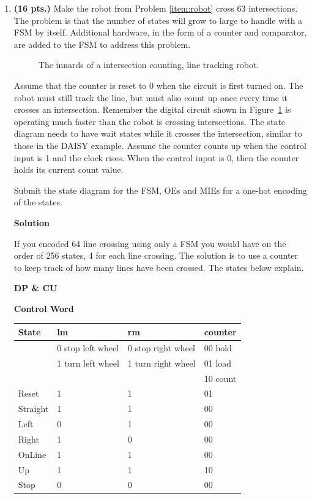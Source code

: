 \begin{enumerate}
\item \textbf{ (16 pts.)}
Make the robot from Problem \ref{item:robot} cross 63 intersections.
The problem is that the number of states will grow to large to handle
with a FSM by itself.  Additional hardware, in the form of a counter 
and comparator, are added to the FSM to address this problem.

\begin{figure}[ht]
\caption{The innards of a intersection counting, line tracking robot.}
\label{fig:linecounter}
\end{figure}

Assume that the counter is reset to 0 when the circuit
is first turned on.  The robot must still track the line, but
must also count up once every time it crosses an intersection.  Remember
the digital circuit shown in Figure~\ref{fig:linecounter} is
operating much faster than the robot is crossing intersections.
The state diagram needs to have wait states while it crosses
the intersection, similar to those
in the DAISY example.  Assume the counter counts up
when the control input is 1 and the clock rises.  When the control
input is 0, then the counter holds its current count value.

Submit the state diagram for the FSM, OEs and MIEs for a one-hot 
encoding of the states.  

\begin{onlysolution}  \textbf{Solution} \itshape{
\pagebreak
If you encoded 64 line crossing using only a FSM you would have
on the order of 256 states, 4 for each line crossing.  The solution
is to use a counter to keep track of how many lines have been crossed.
The states below explain.

\textbf{ DP \& CU}

\begin{figure}[ht]
\end{figure}

\textbf{ Control Word}

\begin{tabular}{l|l|l|l}
State & lm		  & rm			& counter \\ \hline
      & 0 stop left wheel & 0 stop right wheel  & 00 hold \\ \hline
      & 1 turn left wheel & 1 turn right wheel  & 01 load \\ \hline
      &                   &                     & 10 count\\ \hline \hline
Reset	 & 1		  & 1			& 01	  \\ \hline
Straight & 1		  & 1			& 00	  \\ \hline
Left     & 0		  & 1			& 00	  \\ \hline
Right    & 1		  & 0			& 00	  \\ \hline
OnLine   & 1		  & 1			& 00	  \\ \hline
Up	 & 1		  & 1			& 10	  \\ \hline
Stop	 & 0		  & 0			& 00	  \\ 
\end{tabular}

}
\end{onlysolution}
\end{enumerate}
